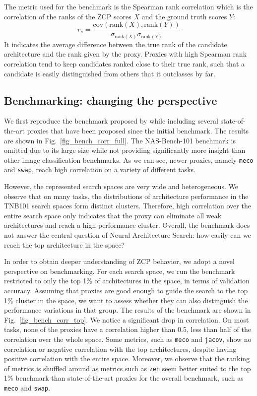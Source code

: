 \documentclass[10pt]{article} %
\begin{document}
The metric used for the benchmark is the Spearman rank correlation which is the correlation of the ranks of the ZCP scores $X$ and the ground truth scores $Y$:
$$
r_s = \frac{\mathrm{cov}\left(\mathrm{rank}(X), \mathrm{rank}(Y)\right)}{\sigma_{\mathrm{rank}(X)}\sigma_{\mathrm{rank}(Y)}}
$$
It indicates the average difference between the true rank of the candidate architecture and the rank given by the proxy. Proxies with high Spearman rank correlation tend to keep candidates ranked close to their true rank, such that a candidate is easily distinguished from others that it outclasses by far.

\subsection{Benchmarking: changing the perspective}
\label{investigation_pov}

We first reproduce the benchmark proposed by \citet{krishnakumar2022bench} while including several state-of-the-art proxies that have been proposed since the initial benchmark. The results are shown in Fig.~\ref{fig_bench_corr_full}. The NAS-Bench-101 benchmark is omitted due to its large size while not providing significantly more insight than other image classification benchmarks. As we can see, newer proxies, namely \texttt{meco} and \texttt{swap}, reach high correlation on a variety of different tasks.

However, the represented search spaces are very wide and heterogeneous. We observe that on many tasks, the distributions of architecture performance in the TNB101 search spaces form distinct clusters. Therefore, high correlation over the entire search space only indicates that the proxy can eliminate all weak architectures and reach a high-performance cluster. Overall, the benchmark does not answer the central question of Neural Architecture Search: how easily can we reach the top architecture in the space?

In order to obtain deeper understanding of ZCP behavior, we adopt a novel perspective on benchmarking. For each search space, we run the benchmark restricted to only the top 1\% of architectures in the space, in terms of validation accuracy. Assuming that proxies are good enough to guide the search to the top 1\% cluster in the space, we want to assess whether they can also distinguish the performance variations in that group. The results of the benchmark are shown in Fig.~\ref{fig_bench_corr_top}. We notice a significant drop in correlation. On most tasks, none of the proxies have a correlation higher than 0.5, less than half of the correlation over the whole space. Some metrics, such as \texttt{meco} and \texttt{jacov}, show no correlation or negative correlation with the top architectures, despite having positive correlation with the entire space. Moreover, we observe that the ranking of metrics is shuffled around as metrics such as \texttt{zen} seem better suited to the top 1\% benchmark than state-of-the-art proxies for the overall benchmark, such as \texttt{meco} and \texttt{swap}.
\end{document}
